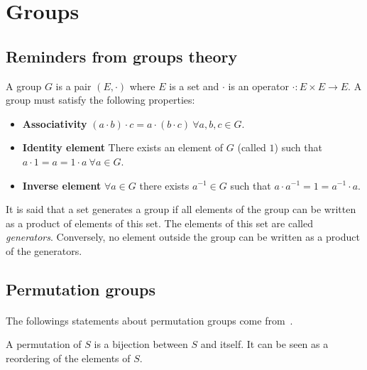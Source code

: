 \section{Groups}

\subsection{Reminders from groups theory}

\begin{definition}[Group]
  A group $G$ is a pair $(E, \cdot)$ where $E$ is a set and $\cdot$ is an operator $\cdot: E \times E \to E$. A group must satisfy the following properties:
  \begin{itemize}
    \item \textbf{Associativity} $(a \cdot b) \cdot c = a \cdot (b \cdot c)\ \forall a,b,c \in G$.
    \item \textbf{Identity element} There exists an element of $G$ (called $1$) such that $a \cdot 1 = a = 1 \cdot a \ \forall a \in G$.
    \item \textbf{Inverse element} $\forall a \in G$ there exists $a^{-1} \in G$ such that $a \cdot a^{-1} = 1 = a^{-1} \cdot a$.
  \end{itemize}
\end{definition}

\begin{definition}
  It is said that a set generates a group if all elements of the group can be written as a product of elements of this set. The elements of this set are called \textit{generators}. Conversely, no element outside the group can be written as a product of the generators.
\end{definition}

\subsection{Permutation groups}

\paragraph{}
The followings statements about permutation groups come from~\cite{cameronPermutationGroups}.

\begin{definition}[Permutation]
  A permutation of $S$ is a bijection between $S$ and itself. It can be seen as a reordering of the elements of $S$.
\end{definition}

